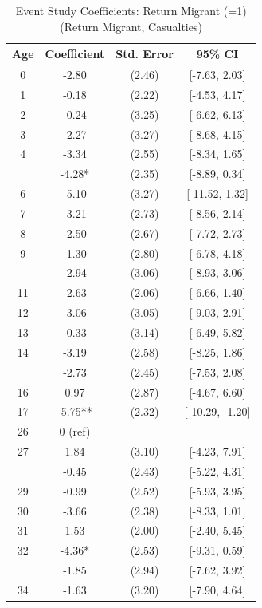 \begin{table}[!h]
\centering
\caption{\label{tab:event_study_8c_return_migrant_casualties}Event Study Coefficients: Return Migrant (=1) (Return Migrant, Casualties)}
\centering
\fontsize{9}{11}\selectfont
\begin{threeparttable}
\begin{tabular}[t]{cccc}
\toprule
Age & Coefficient & Std. Error & 95\% CI\\
\midrule
0 & -2.80 & (2.46) & {}[-7.63, 2.03]\\
1 & -0.18 & (2.22) & {}[-4.53, 4.17]\\
2 & -0.24 & (3.25) & {}[-6.62, 6.13]\\
3 & -2.27 & (3.27) & {}[-8.68, 4.15]\\
4 & -3.34 & (2.55) & {}[-8.34, 1.65]\\
\addlinespace
5 & -4.28* & (2.35) & {}[-8.89, 0.34]\\
6 & -5.10 & (3.27) & {}[-11.52, 1.32]\\
7 & -3.21 & (2.73) & {}[-8.56, 2.14]\\
8 & -2.50 & (2.67) & {}[-7.72, 2.73]\\
9 & -1.30 & (2.80) & {}[-6.78, 4.18]\\
\addlinespace
10 & -2.94 & (3.06) & {}[-8.93, 3.06]\\
11 & -2.63 & (2.06) & {}[-6.66, 1.40]\\
12 & -3.06 & (3.05) & {}[-9.03, 2.91]\\
13 & -0.33 & (3.14) & {}[-6.49, 5.82]\\
14 & -3.19 & (2.58) & {}[-8.25, 1.86]\\
\addlinespace
15 & -2.73 & (2.45) & {}[-7.53, 2.08]\\
16 & 0.97 & (2.87) & {}[-4.67, 6.60]\\
17 & -5.75** & (2.32) & {}[-10.29, -1.20]\\
26 & 0 (ref) &  & \\
27 & 1.84 & (3.10) & {}[-4.23, 7.91]\\
\addlinespace
28 & -0.45 & (2.43) & {}[-5.22, 4.31]\\
29 & -0.99 & (2.52) & {}[-5.93, 3.95]\\
30 & -3.66 & (2.38) & {}[-8.33, 1.01]\\
31 & 1.53 & (2.00) & {}[-2.40, 5.45]\\
32 & -4.36* & (2.53) & {}[-9.31, 0.59]\\
\addlinespace
33 & -1.85 & (2.94) & {}[-7.62, 3.92]\\
34 & -1.63 & (3.20) & {}[-7.90, 4.64]\\

\end{tabular}
\end{threeparttable}
\end{table}
